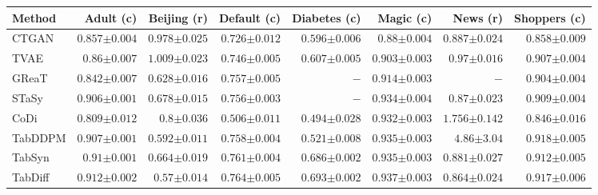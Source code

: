 \begin{tabular}{lrrrrrrr}
    \toprule[0.8pt]
     \textbf{Method} & \textbf{Adult} (c) & \textbf{Beijing} (r) & \textbf{Default} (c) & \textbf{Diabetes} (c) & \textbf{Magic} (c) & \textbf{News} (r)& \textbf{Shoppers} (c) \\
    \midrule 
    CTGAN & $0.857${\tiny${\pm 0.004}$} & $0.978${\tiny${\pm 0.025}$} & $0.726${\tiny${\pm 0.012}$} & $0.596${\tiny${\pm 0.006}$} & $0.88${\tiny${\pm 0.004}$} & $0.887${\tiny${\pm 0.024}$} & $0.858${\tiny${\pm 0.009}$} \\
    TVAE & $0.86${\tiny${\pm 0.007}$} & $1.009${\tiny${\pm 0.023}$} & $0.746${\tiny${\pm 0.005}$} & $0.607${\tiny${\pm 0.005}$} & $0.903${\tiny${\pm 0.003}$} & $0.97${\tiny${\pm 0.016}$} & $0.907${\tiny${\pm 0.004}$} \\
    GReaT & $0.842${\tiny${\pm 0.007}$} & $0.628${\tiny${\pm 0.016}$} & $0.757${\tiny${\pm 0.005}$} & $-$ & $0.914${\tiny${\pm 0.003}$} & $-$ & $0.904${\tiny${\pm 0.004}$} \\
    STaSy & $0.906${\tiny${\pm 0.001}$} & $0.678${\tiny${\pm 0.015}$} & $0.756${\tiny${\pm 0.003}$} & $-$ & $0.934${\tiny${\pm 0.004}$} & $0.87${\tiny${\pm 0.023}$} & $0.909${\tiny${\pm 0.004}$} \\
    CoDi & $0.809${\tiny${\pm 0.012}$} & $0.8${\tiny${\pm 0.036}$} & $0.506${\tiny${\pm 0.011}$} & $0.494${\tiny${\pm 0.028}$} & $0.932${\tiny${\pm 0.003}$} & $1.756${\tiny${\pm 0.142}$} & $0.846${\tiny${\pm 0.016}$} \\
    TabDDPM & $0.907${\tiny${\pm 0.001}$} & $0.592${\tiny${\pm 0.011}$} & $0.758${\tiny${\pm 0.004}$} & $0.521${\tiny${\pm 0.008}$} & $0.935${\tiny${\pm 0.003}$} & $4.86${\tiny${\pm 3.04}$} & $0.918${\tiny${\pm 0.005}$} \\    
    TabSyn & $0.91${\tiny${\pm 0.001}$} & $0.664${\tiny${\pm 0.019}$} & $0.761${\tiny${\pm 0.004}$} & $0.686${\tiny${\pm 0.002}$} & $0.935${\tiny${\pm 0.003}$} & $0.881${\tiny${\pm 0.027}$} & $0.912${\tiny${\pm 0.005}$} \\
    TabDiff & $0.912${\tiny${\pm 0.002}$} & $0.57${\tiny${\pm 0.014}$} & $0.764${\tiny${\pm 0.005}$} & $0.693${\tiny${\pm 0.002}$} & $0.937${\tiny${\pm 0.003}$} & $0.864${\tiny${\pm 0.024}$} & $0.917${\tiny${\pm 0.006}$} \\
    \midrule

\end{tabular}
